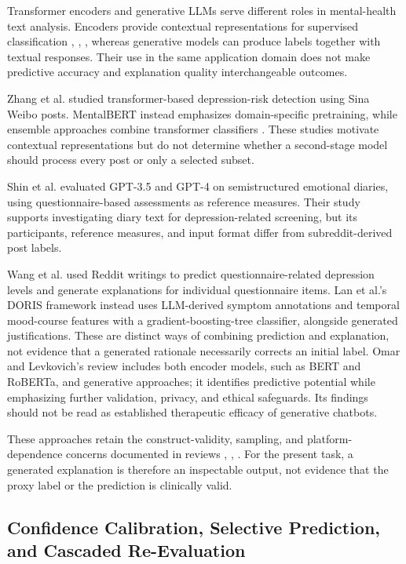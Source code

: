 \documentclass{ieeeaccess}
\begin{document}
Transformer encoders and generative LLMs serve different roles in mental-health text analysis. Encoders provide contextual representations for supervised classification \cite{ref8}, \cite{ref33}, \cite{ref34}, whereas generative models can produce labels together with textual responses. Their use in the same application domain does not make predictive accuracy and explanation quality interchangeable outcomes.

Zhang et al. \cite{ref33} studied transformer-based depression-risk detection using Sina Weibo posts. MentalBERT \cite{ref8} instead emphasizes domain-specific pretraining, while ensemble approaches combine transformer classifiers \cite{ref34}. These studies motivate contextual representations but do not determine whether a second-stage model should process every post or only a selected subset.

Shin et al. \cite{ref35} evaluated GPT-3.5 and GPT-4 on semistructured emotional diaries, using questionnaire-based assessments as reference measures. Their study supports investigating diary text for depression-related screening, but its participants, reference measures, and input format differ from subreddit-derived post labels.

Wang et al. \cite{ref43} used Reddit writings to predict questionnaire-related depression levels and generate explanations for individual questionnaire items. Lan et al.'s DORIS framework \cite{ref44} instead uses LLM-derived symptom annotations and temporal mood-course features with a gradient-boosting-tree classifier, alongside generated justifications. These are distinct ways of combining prediction and explanation, not evidence that a generated rationale necessarily corrects an initial label. Omar and Levkovich's review \cite{ref45} includes both encoder models, such as BERT and RoBERTa, and generative approaches; it identifies predictive potential while emphasizing further validation, privacy, and ethical safeguards. Its findings should not be read as established therapeutic efficacy of generative chatbots.

These approaches retain the construct-validity, sampling, and platform-dependence concerns documented in reviews \cite{ref36}, \cite{ref37}, \cite{ref46}. For the present task, a generated explanation is therefore an inspectable output, not evidence that the proxy label or the prediction is clinically valid.

\subsection{Confidence Calibration, Selective Prediction, and Cascaded Re-Evaluation}
\end{document}
